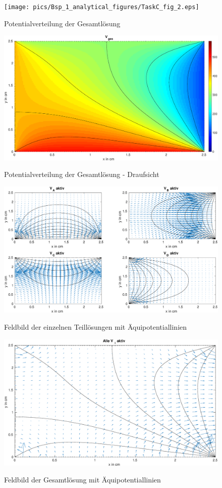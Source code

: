 \begin{figure}[H]
  \centering
  		\texttt{[image: pics/Bsp\_1\_analytical\_figures/TaskC\_fig\_2.eps]}
  \label{fig:Ana:TaskC:Complete}
  \caption{Potentialverteilung der Gesamtlösung}
\end{figure}

\begin{figure}[H]
  \centering
  		\includegraphics[width=1.0\textwidth]{pics/Bsp_1_analytical_figures/TaskC_fig_4.eps}
  \label{fig:Ana:TaskC:CompleteRot}
  \caption{Potentialverteilung der Gesamtlösung - Draufsicht}
\end{figure}


\begin{figure}[H]
  \centering
  		\includegraphics[width=1.0\textwidth]{pics/Bsp_1_analytical_figures/TaskC_fig_5.eps}
  \label{fig:Ana:TaskC:Field:Individual}
  \caption{Feldbild der einzelnen Teillösungen mit Äquipotentiallinien}
\end{figure}

\begin{figure}[H]
  \centering
  		\includegraphics[width=1.0\textwidth]{pics/Bsp_1_analytical_figures/TaskC_fig_6.eps}
  \label{fig:Ana:TaskC:Field:Complete}
  \caption{Feldbild der Gesamtlösung mit Äquipotentiallinien}
\end{figure}

